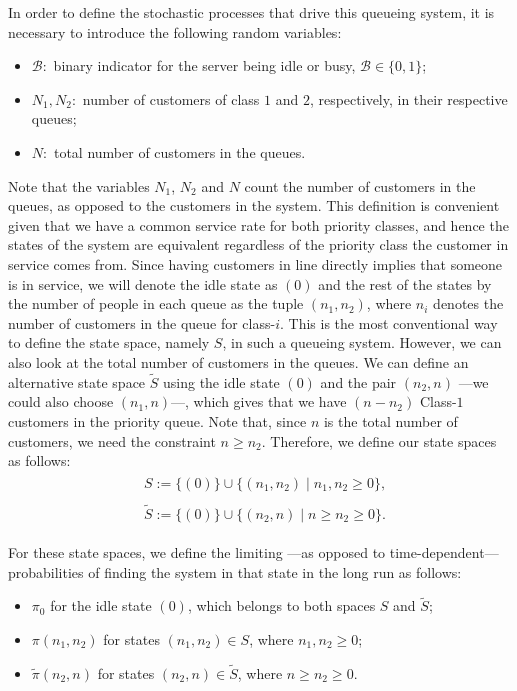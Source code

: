 In order to define the stochastic processes that drive this queueing system, it is
necessary to introduce the following random variables:
\begin{itemize}
    \item $\mathcal{B}:$ binary indicator for the server being idle or busy, $\mathcal{B}\in \{0,1\}$;
    \item $N_1, N_2:$ number of customers of class $1$ and $2$, respectively, in their respective queues;
    \item $N:$ total number of customers in the queues.
\end{itemize}
Note that the variables $N_1$, $N_2$ and $N$ count the number of customers in the
queues, as opposed to the customers in the system. This definition is convenient
given that we have a common service rate for both priority classes, and hence the
states of the system are equivalent regardless of the priority class the customer
in service comes from. Since having customers in line directly implies that someone
is in service, we will denote the idle state as $(0)$ and the rest of the states by
the number of people in each queue as the tuple $(n_1,n_2)$, where $n_i$ denotes the
number of customers in the queue for class-$i$. This is the most conventional way to
define the state space, namely $S$, in such a queueing system. However, we can also
look at the total number of customers in the queues. We can define an alternative
state space $\widetilde{S}$ using the idle state $(0)$ and the pair $(n_2,n)$ —we
could also choose $(n_1,n)$—, which gives that we have $(n-n_2)$ Class-$1$ customers
in the priority queue. Note that, since $n$ is the total number of customers, we
need the constraint $n \geq n_2$.
Therefore, we define our state spaces as follows:
\begin{align}
    \begin{split}
        &S := \{(0)\} \cup \{ (n_1,n_2) \mid n_1,n_2 \geq 0 \},
        \label{eq:gen:state_space_S}
    \end{split} \\
    \begin{split}
        &\widetilde{S} := \{(0)\} \cup \{ (n_2,n) \mid n \geq n_2 \geq 0 \}.
        \label{eq:gen:state_space_Stilde}
    \end{split}
\end{align}

For these state spaces, we define the limiting —as opposed to time-dependent—
probabilities of finding the system in that state in the long run as follows:
\begin{itemize}
    \item $\pi_0$ for the idle state $(0)$, which belongs to both spaces $S$ and $\widetilde{S}$;
    \item $\pi(n_1,n_2)$ for states $(n_1,n_2) \in S$, where $n_1,n_2 \geq 0$;
    \item $\widetilde{\pi}(n_2,n)$ for states $(n_2,n) \in \widetilde{S}$, where $n \geq n_2 \geq 0$.
\end{itemize}

